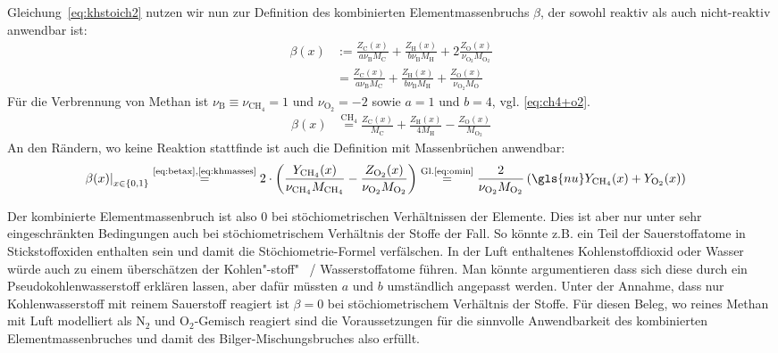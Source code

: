 Gleichung~\ref{eq:khstoich2} nutzen wir nun zur Definition des kombinierten Elementmassenbruchs $\beta$, der sowohl reaktiv als auch nicht-reaktiv anwendbar ist:
\begin{align}
    \label{eq:betax}
    \beta(x) & := \frac{ Z_\mathrm{C}(x) }{ a \nu_\mathrm{B} M_\mathrm{C} }
          +   \frac{ Z_\mathrm{H}(x) }{ b \nu_\mathrm{B} M_\mathrm{H} }
          + 2 \frac{ Z_\mathrm{O}(x) }{ \nu_{\mathrm{O}_2} M_{\mathrm{O}_2} }
    \\   &  = \frac{ Z_\mathrm{C}(x) }{ a \nu_\mathrm{B} M_\mathrm{C} }
          +   \frac{ Z_\mathrm{H}(x) }{ b \nu_\mathrm{B} M_\mathrm{H} }
          +   \frac{ Z_\mathrm{O}(x) }{ \nu_{\mathrm{O}_2} M_\mathrm{O} }
\end{align}
Für die Verbrennung von Methan ist $\nu_\mathrm{B} \equiv \nu_{\mathrm{CH}_4} = 1$ und $\nu_{\mathrm{O}_2} = -2$ sowie $a=1$ und $b=4$, vgl. \autoref{eq:ch4+o2}.
\begin{align}
    \label{eq:betach4}
    \beta(x) & \overset{\mathrm{CH}_4}{=}
        \frac{ Z_\mathrm{C}(x) }{ M_\mathrm{C} }
      + \frac{ Z_\mathrm{H}(x) }{ 4 M_\mathrm{H} }
      - \frac{ Z_\mathrm{O}(x) }{ M_{\mathrm{O}_2} }
\end{align}
An den Rändern, wo keine Reaktion stattfinde ist auch die Definition mit Massenbrüchen anwendbar:
\begin{align}
    \label{eq:betach4Y}
    \left.\beta(x)\right|_{x\in\lbrace 0,1 \rbrace} &
    \overset{\text{\autoref{eq:betax},\ref{eq:khmasses}}}{=}
    2 \cdot \left(
        \frac{ Y_{\mathrm{CH}_4}(x) }{ \nu_{\mathrm{CH}_4} M_{\mathrm{CH}_4} } -
        \frac{ Z_{\mathrm{O}_2}(x) }{ \nu_{\mathrm{O}_2} M_{\mathrm{O}_2} }
    \right)
    \overset{\text{Gl.\pageref{eq:omin}}}{=}
        \frac{2}{ \nu_{\mathrm{O}_2} M_{\mathrm{O}_2} } \left(
            \gls{nu} Y_{\mathrm{CH}_4}(x) +
            Y_{\mathrm{O}_2}(x)
        \right)
\end{align}

Der kombinierte Elementmassenbruch ist also 0 bei stöchiometrischen Verhältnissen der Elemente. Dies ist aber nur unter sehr eingeschränkten Bedingungen auch bei stöchiometrischem Verhältnis der Stoffe der Fall. So könnte z.B. ein Teil der Sauerstoffatome in Stickstoffoxiden enthalten sein und damit die Stöchiometrie-Formel verfälschen. In der Luft enthaltenes Kohlenstoffdioxid oder Wasser würde auch zu einem überschätzen der Kohlen"-stoff"~ / Wasserstoffatome führen. Man könnte argumentieren dass sich diese durch ein Pseudokohlenwasserstoff erklären lassen, aber dafür müssten $a$ und $b$ umständlich angepasst werden. Unter der Annahme, dass nur Kohlenwasserstoff mit reinem Sauerstoff reagiert ist $\beta=0$ bei stöchiometrischem Verhältnis der Stoffe. Für diesen Beleg, wo reines Methan mit Luft modelliert als $\mathrm{N}_2$ und $\mathrm{O}_2$-Gemisch reagiert sind die Voraussetzungen für die sinnvolle Anwendbarkeit des kombinierten Elementmassenbruches und damit des Bilger-Mischungsbruches also erfüllt.\\

